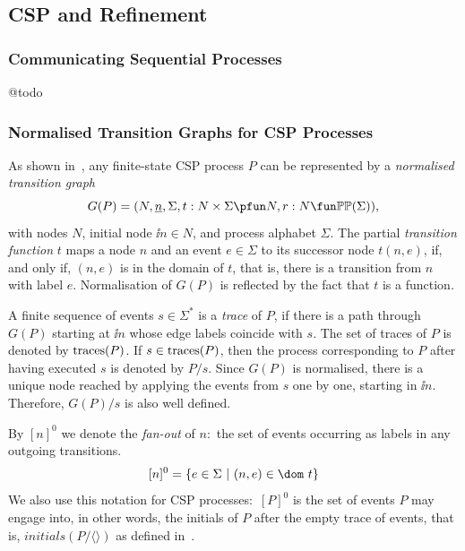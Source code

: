 \subsection{CSP and Refinement}


\subsubsection*{Communicating Sequential Processes} @todo

\subsubsection*{Normalised Transition Graphs for CSP Processes}
\label{sec:ntg}

As shown in~\cite{Roscoe:1994:CME:197600}, any finite-state CSP process $P$
can be represented by a \emph{normalised transition graph}
$$
G(P) = ( N, \ii n, \Sigma, t : N\times\Sigma \pfun N, r : N \fun \mathbb{P}\mathbb{P}(\Sigma)),
$$
with nodes $N$, initial node $\ii n\in N$, and process alphabet $\Sigma$. The
partial \emph{transition function} $t$ maps a node $n$ and an event
$e\in\Sigma$ to its successor node $t(n,e)$, if, and only if, $(n,e)$ is in
the domain of $t$, that is, there is a transition from $n$ with label $e$.
Normalisation of $G(P)$ is reflected by the fact that $t$ is a function.

A finite sequence of events $s\in\Sigma^*$ is a \emph{trace} of $P$, if there
is a path through $G(P)$ starting  at $\ii n$ whose edge labels coincide with
$s$. The set of traces of $P$ is denoted by $\text{traces}(P)$. If $s\in\text{traces}(P)$, then
the process corresponding to $P$ after having executed $s$ is denoted by
$P/s$. Since $G(P)$ is normalised, there is a unique node reached by applying
the events from $s$ one by one, starting in $\ii n$. Therefore, $G(P)/s$  is
also well defined.

By $[n]^0$ we denote the \emph{fan-out} of $n$:~the set of events occurring
as labels in any outgoing transitions.
$$
[n]^0 = \{ e\in\Sigma~|~(n,e)\in\dom~t \}
$$
We also use this notation for CSP processes:~$[P]^0$ is the set
of events $P$ may engage into, in other words, the initials of $P$ after the
empty trace of events, that is, $initials(P/\langle\rangle)$ as defined
in~\cite{Roscoe2010}.

